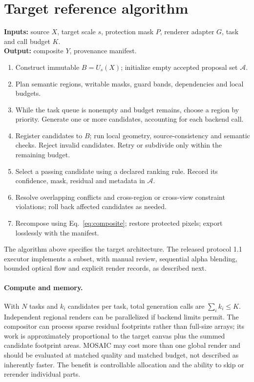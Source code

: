 \documentclass[10pt,twocolumn]{article}
\begin{document}
\section{Target reference algorithm}\label{sec:target-algorithm}
\noindent\textbf{Inputs:} source $X$, target scale $s$, protection mask $P$, renderer adapter $G$, task and call budget $K$.\\
\textbf{Output:} composite $Y$, provenance manifest.
\begin{enumerate}\setlength{\itemsep}{1pt}
\item Construct immutable $B=U_s(X)$; initialize empty accepted proposal set $\mathcal A$.
\item Plan semantic regions, writable masks, guard bands, dependencies and local budgets.
\item While the task queue is nonempty and budget remains, choose a region by priority. Generate one or more candidates, accounting for each backend call.
\item Register candidates to $B$; run local geometry, source-consistency and semantic checks. Reject invalid candidates. Retry or subdivide only within the remaining budget.
\item Select a passing candidate using a declared ranking rule. Record its confidence, mask, residual and metadata in $\mathcal A$.
\item Resolve overlapping conflicts and cross-region or cross-view constraint violations; roll back affected candidates as needed.
\item Recompose using Eq.~\eqref{eq:composite}; restore protected pixels; export losslessly with the manifest.
\end{enumerate}
The algorithm above specifies the target architecture. The released protocol 1.1 executor implements a subset, with manual review, sequential alpha blending, bounded optical flow and explicit render records, as described next.

\paragraph{Compute and memory.} With $N$ tasks and $k_i$ candidates per task, total generation calls are $\sum_i k_i\le K$. Independent regional renders can be parallelized if backend limits permit. The compositor can process sparse residual footprints rather than full-size arrays; its work is approximately proportional to the target canvas plus the summed candidate footprint areas. MOSAIC may cost more than one global render and should be evaluated at matched quality and matched budget, not described as inherently faster. The benefit is controllable allocation and the ability to skip or rerender individual parts.
\end{document}
